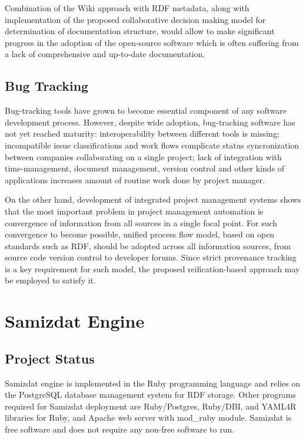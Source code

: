 \documentclass{llncs}
\begin{document}
Combination of the Wiki approach with RDF metadata, along with implementation
of the proposed collaborative decision making model for determination of
documentation structure, would allow to make significant progress in the
adoption of the open-source software which is often suffering from a lack of
comprehensive and up-to-date documentation.

\subsection{Bug Tracking}

Bug-tracking tools have grown to become essential component of any software
development process. However, despite wide adoption, bug-tracking software has
not yet reached maturity: interoperability between different tools is missing;
incompatible issue classifications and work flows complicate status
syncronization between companies collaborating on a single project; lack of
integration with time-management, document management, version control and
other kinds of applications increases amount of routine work done by project
manager.

On the other hand, development of integrated project management systems shows
that the most important problem in project management automation is
convergence of information from all sources in a single focal point. For such
convergence to become possible, unified process flow model, based on open
standards such as RDF, should be adopted across all information sources, from
source code version control to developer forums. Since strict provenance
tracking is a key requirement for such model, the proposed reification-based
approach may be employed to satisfy it.


\section{Samizdat Engine}
%
\subsection{Project Status}

Samizdat engine is implemented in the Ruby programming language and relies on
the PostgreSQL database management system for RDF storage. Other programs
required for Samizdat deployment are Ruby/Postgres, Ruby/DBI, and YAML4R
libraries for Ruby, and Apache web server with mod\_ruby module. Samizdat is
free software and does not require any non-free software to
run\cite{impl-report}.
\end{document}
